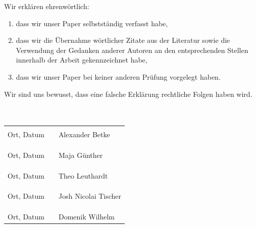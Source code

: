 \documentclass[12pt, a4paper, listof=totoc, bibliography=totoc, numbers=noenddot, ngerman, headsepline, oneside]{scrbook}
\begin{document}
Wir erklären ehrenwörtlich:
\begin{enumerate}
	\item dass wir unser Paper selbstständig verfasst habe,
	\item dass wir die Übernahme wörtlicher Zitate aus der Literatur sowie die Verwendung der Gedanken anderer Autoren an den entsprechenden Stellen innerhalb der Arbeit gekennzeichnet habe,
	\item dass wir unser Paper bei keiner anderen Prüfung vorgelegt haben.
\end{enumerate}
Wir sind uns bewusst, dass eine falsche Erklärung rechtliche Folgen haben wird.\\
\\ \\
\begin{tabular}{lp{2em}l} 
 \hspace{4cm}   && \hspace{7cm} \\\cline{1-1}\cline{3-3} 
 \small{Ort, Datum} && \small{Alexander Betke} \\
 \\\\
 \hspace{4cm}   && \hspace{7cm} \\\cline{1-1}\cline{3-3} 
 \small{Ort, Datum} && \small{Maja Günther} \\
 \\\\
  \hspace{4cm}   && \hspace{7cm} \\\cline{1-1}\cline{3-3} 
 \small{Ort, Datum} && \small{Theo Leuthardt} \\
 \\\\
  \hspace{4cm}   && \hspace{7cm} \\\cline{1-1}\cline{3-3} 
 \small{Ort, Datum} && \small{Josh Nicolai Tischer} \\
 \\\\
  \hspace{4cm}   && \hspace{7cm} \\\cline{1-1}\cline{3-3} 
 \small{Ort, Datum} && \small{Domenik Wilhelm} \\
\end{tabular}
\end{document}
